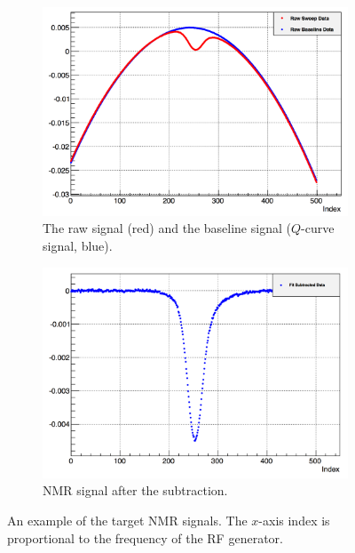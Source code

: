 \begin{figure}[p!]
  \centering
  \begin{subfigure}[t]{0.49\textwidth}
    \includegraphics[width=\textwidth]{figs/target-NMR-raw.png}
    \caption{The raw signal (red) and the baseline signal ($Q$-curve signal, blue). \label{C5S3SS3F1a}}
  \end{subfigure}
  \begin{subfigure}[t]{0.49\textwidth}
    \includegraphics[width=\textwidth]{figs/target-NMR-signal.png}
    \caption{NMR signal after the subtraction. \label{C5S3SS3F1b}}
  \end{subfigure}
  \caption[Target NMR signals.]{An example of the target NMR signals. The $x$-axis index is proportional to the frequency of the RF generator. \label{C5S3SS3F1}}
\end{figure}

